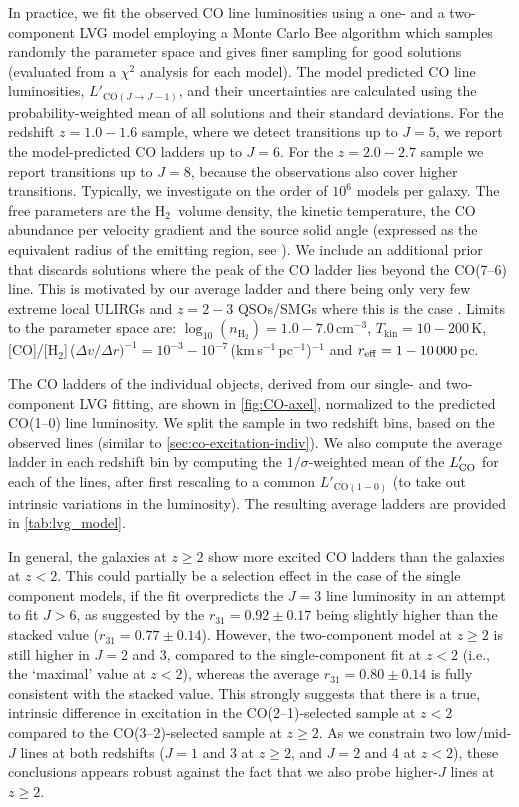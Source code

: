 \documentclass[twocolumn]{aastex62}
\newcommand{\HH}{\ensuremath{\mathrm{H}_{2}}}
\newcommand{\Tkin}{\ensuremath{T_{\mathrm{kin}}}}
\newcommand{\nHH}{\ensuremath{n_{\HH}}}
\newcommand{\rThreeOneLVGzHiOne}{\ensuremath{0.92 \pm 0.17}}
\newcommand{\rThreeOneLVGzHiTwo}{\ensuremath{0.80 \pm 0.14}}
\newcommand{\rThreeOnestack}{\ensuremath{0.77 \pm 0.14}}
\begin{document}
In practice, we fit the observed CO line luminosities using a one- and a
two-component LVG model employing a Monte Carlo Bee algorithm \citep{Pham2009}
which samples randomly the parameter space and gives finer sampling for good
solutions (evaluated from a $\chi^{2}$ analysis for each model).  The model
predicted CO line luminosities, $L'_{\mathrm{CO}(J\rightarrow J-1)}$, and their
uncertainties are calculated using the probability-weighted mean of all
solutions and their standard deviations.  For the redshift $z=1.0 - 1.6$
sample, where we detect transitions up to $J=5$, we report the model-predicted
CO ladders up to $J=6$.  For the $z=2.0-2.7$ sample we report transitions up to
$J=8$, because the observations also cover higher transitions.  Typically, we
investigate on the order of $10^6$ models per galaxy.  The free parameters are
the \HH\ volume density, the kinetic temperature, the CO abundance per velocity
gradient and the source solid angle (expressed as the equivalent radius of the
emitting region, see \citealt{Weiss2007}).  We include an additional prior that
discards solutions where the peak of the CO ladder lies beyond the CO(7--6)
line.  This is motivated by our average ladder and there being only very few
extreme local ULIRGs and $z=2-3$ QSOs/SMGs where this is the case
\citep[cf.][]{Weiss2007proc, Carilli2013}.  Limits to the parameter space are:
$\log_{10}(\nHH) =1.0-7.0$\,cm$^{-3}$, $\Tkin =10-200$\,K,
[CO]/[\HH]\,($\Delta v/\Delta
r)^{-1}=10^{-3}-10^{-7}$\,(km\,s$^{-1}$\,pc$^{-1}$)$^{-1}$ and
$r_{\rm eff} = 1-10\,000$\,pc.

The CO ladders of the individual objects, derived from our single- and
two-component LVG fitting, are shown in \autoref{fig:CO-axel}, normalized to
the predicted CO(1--0) line luminosity.  We split the sample in two redshift
bins, based on the observed lines (similar to
\autoref{sec:co-excitation-indiv}).  We also compute the average ladder in each
redshift bin by computing the $1/\sigma$-weighted mean of the $L'_{\rm CO}$ for
each of the lines, after first rescaling to a common $L'_{\mathrm{CO(1-0)}}$
(to take out intrinsic variations in the luminosity).  The resulting average
ladders are provided in \autoref{tab:lvg_model}.

In general, the galaxies at $z \geq 2$ show more excited CO ladders than the
galaxies at $z<2$.  This could partially be a selection effect in the case of
the single component models, if the fit overpredicts the $J=3$ line luminosity
in an attempt to fit $J>6$, as suggested by the $r_{31} = \rThreeOneLVGzHiOne$
being slightly higher than the stacked value ($r_{31} = \rThreeOnestack$).
However, the two-component model at $z\geq2$ is still higher in $J=2$ and 3,
compared to the single-component fit at $z<2$ (i.e., the `maximal' value at
$z<2$), whereas the average $r_{31} = \rThreeOneLVGzHiTwo$ is fully consistent
with the stacked value.  This strongly suggests that there is a true, intrinsic
difference in excitation in the CO(2--1)-selected sample at $z<2$ compared to
the CO(3--2)-selected sample at $z\ge2$.  As we constrain two low/mid-$J$ lines
at both redshifts ($J=1$ and 3 at $z\ge2$, and $J=2$ and 4 at $z<2$), these
conclusions appears robust against the fact that we also probe higher-$J$ lines
at $z\ge2$.
\end{document}
